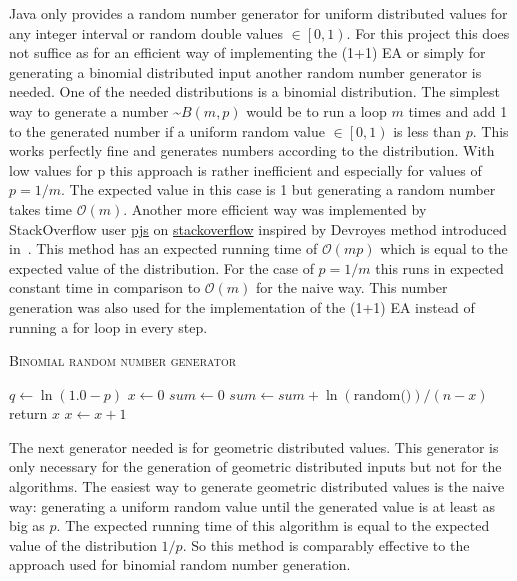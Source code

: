 Java only provides a random number generator for uniform distributed values for any integer interval or random double values $\in \left[0, 1\right)$.
For this project this does not suffice as for an efficient way of implementing the (1+1) EA or simply for generating a binomial distributed input another random number generator is needed.
One of the needed distributions is a binomial distribution.
The simplest way to generate a number \textasciitilde$B(m,p)$ would be to run a loop $m$ times and add 1 to the generated number if a uniform random value $\in \left[0, 1\right)$ is less than $p$.
This works perfectly fine and generates numbers according to the distribution.
With low values for p this approach is rather inefficient and especially for values of $p=1/m$.
The expected value in this case is 1 but generating a random number takes time $\mathcal{O}(m)$.
Another more efficient way was implemented by StackOverflow user \href{https://stackoverflow.com/users/2166798/pjs}{pjs} on \href{https://stackoverflow.com/questions/23561551/a-efficient-binomial-random-number-generator-code-in-java}{stackoverflow} inspired by Devroyes method introduced in~\cite{devroye2006nonuniform}.
This method has an expected running time of $\mathcal{O}(mp)$ which is equal to the expected value of the distribution.
For the case of $p=1/m$ this runs in expected constant time in comparison to $\mathcal{O}(m)$ for the naive way.
This number generation was also used for the implementation of the (1+1) EA instead of running a for loop in every step.

\begin{algorithm}[h]
      \caption{\textsc{Binomial random number generator}}\label{alg:binomialRNG}

      \DontPrintSemicolon %
      $q \leftarrow \ln(1.0 - p)$\;
      $x \leftarrow 0$\;
      $sum \leftarrow 0$\;
      {
      $sum \leftarrow sum +\ln(\text{random()}) / (n - x)$\; \tcp{random() generates a random value $\in \left[0, 1\right)$}
      {
            return $x$\;
      }
      $x \leftarrow x + 1$\;
      }
\end{algorithm}

The next generator needed is for geometric distributed values.
This generator is only necessary for the generation of geometric distributed inputs but not for the algorithms.
The easiest way to generate geometric distributed values is the naive way:
generating a uniform random value until the generated value is at least as big as $p$.
The expected running time of this algorithm is equal to the expected value of the distribution $1/p$.
So this method is comparably effective to the approach used for binomial random number generation.

